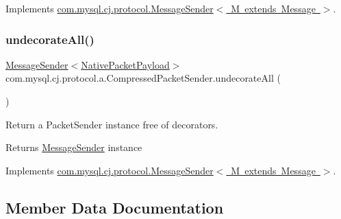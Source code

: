 Implements \mbox{\hyperlink{interfacecom_1_1mysql_1_1cj_1_1protocol_1_1_message_sender_a3a352bf35ad98dc6cea7c1f4ac9480da}{com.\+mysql.\+cj.\+protocol.\+Message\+Sender$<$ M extends Message $>$}}.

\mbox{\label{classcom_1_1mysql_1_1cj_1_1protocol_1_1a_1_1_compressed_packet_sender_a06ec74d67adf77498b1f95148cd59323}} 
\subsubsection{\texorpdfstring{undecorate\+All()}{undecorateAll()}}
{\footnotesize\ttfamily \mbox{\hyperlink{interfacecom_1_1mysql_1_1cj_1_1protocol_1_1_message_sender}{Message\+Sender}}$<$\mbox{\hyperlink{classcom_1_1mysql_1_1cj_1_1protocol_1_1a_1_1_native_packet_payload}{Native\+Packet\+Payload}}$>$ com.\+mysql.\+cj.\+protocol.\+a.\+Compressed\+Packet\+Sender.\+undecorate\+All (\begin{DoxyParamCaption}{ }\end{DoxyParamCaption})}

Return a Packet\+Sender instance free of decorators.

\begin{DoxyReturn}{Returns}
\mbox{\hyperlink{interfacecom_1_1mysql_1_1cj_1_1protocol_1_1_message_sender}{Message\+Sender}} instance 
\end{DoxyReturn}


Implements \mbox{\hyperlink{interfacecom_1_1mysql_1_1cj_1_1protocol_1_1_message_sender_a8066931f03c2fa9cc705716fa10a4517}{com.\+mysql.\+cj.\+protocol.\+Message\+Sender$<$ M extends Message $>$}}.



\subsection{Member Data Documentation}
\mbox{\label{classcom_1_1mysql_1_1cj_1_1protocol_1_1a_1_1_compressed_packet_sender_af23eba021b7b5002ef05f27bba7733e8}} 
